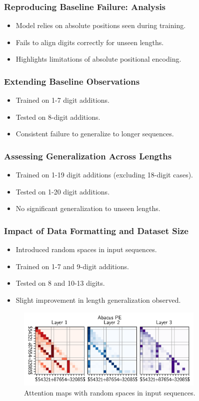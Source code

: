 \documentclass[14pt,aspectratio=169]{beamer}
\theoremstyle{remark}
\begin{document}
\begin{frame}
    \frametitle{Reproducing Baseline Failure: Analysis}
    \begin{itemize}
        \item Model relies on absolute positions seen during training.
        \item Fails to align digits correctly for unseen lengths.
        \item Highlights limitations of absolute positional encoding.
    \end{itemize}
\end{frame}

\begin{frame}
    \frametitle{Extending Baseline Observations}
    \begin{itemize}
        \item Trained on 1-7 digit additions.
        \item Tested on 8-digit additions.
        \item Consistent failure to generalize to longer sequences.
    \end{itemize}
\end{frame}

\begin{frame}
    \frametitle{Assessing Generalization Across Lengths}
    \begin{itemize}
        \item Trained on 1-19 digit additions (excluding 18-digit cases).
        \item Tested on 1-20 digit additions.
        \item No significant generalization to unseen lengths.
    \end{itemize}
\end{frame}

\begin{frame}
    \frametitle{Impact of Data Formatting and Dataset Size}
    \begin{itemize}
        \item Introduced random spaces in input sequences.
        \item Trained on 1-7 and 9-digit additions.
        \item Tested on 8 and 10-13 digits.
        \item Slight improvement in length generalization observed.
    \end{itemize}
    \begin{figure}
        \centering
        \includegraphics[width=0.8\textwidth]{fig/attn_map_abacus_pe.png}
        \caption{Attention maps with random spaces in input sequences.}
    \end{figure}
\end{frame}
\end{document}
